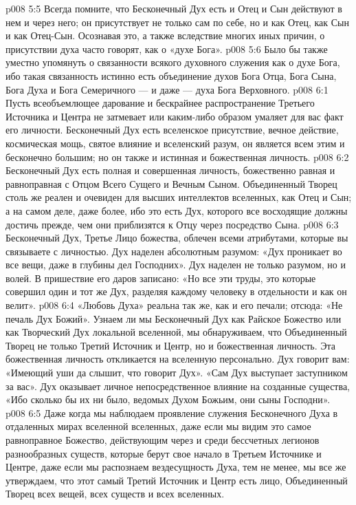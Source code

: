 \vs p008 5:5 Всегда помните, что Бесконечный Дух есть    и Отец и Сын действуют в нем и через него; он присутствует не только сам по себе, но и как Отец, как Сын и как Отец\hyp{}Сын. Осознавая это, а также вследствие многих иных причин, о присутствии духа часто говорят, как о «духе Бога».
\vs p008 5:6 Было бы также уместно упомянуть о связанности всякого духовного служения как о духе Бога, ибо такая связанность истинно есть объединение духов Бога Отца, Бога Сына, Бога Духа и Бога Семеричного --- и даже --- духа Бога Верховного.
\vs p008 6:1 Пусть всеобъемлющее дарование и бескрайнее распространение Третьего Источника и Центра не затмевает или каким\hyp{}либо образом умаляет для вас факт его личности. Бесконечный Дух есть вселенское присутствие, вечное действие, космическая мощь, святое влияние и вселенский разум, он является всем этим и бесконечно большим; но он также и истинная и божественная личность.
\vs p008 6:2 Бесконечный Дух есть полная и совершенная личность, божественно равная и равноправная с Отцом Всего Сущего и Вечным Сыном. Объединенный Творец столь же реален и очевиден для высших интеллектов вселенных, как Отец и Сын; а на самом деле, даже более, ибо это есть Дух, которого все восходящие должны достичь прежде, чем они приблизятся к Отцу через посредство Сына.
\vs p008 6:3 Бесконечный Дух, Третье Лицо божества, облечен всеми атрибутами, которые вы связываете с личностью. Дух наделен абсолютным разумом: «Дух проникает во все вещи, даже в глубины дел Господних». Дух наделен не только разумом, но и волей. В пришествие его даров записано: «Но все эти труды, это которые совершил один и тот же Дух, разделяя каждому человеку в отдельности и как он велит».
\vs p008 6:4 «Любовь Духа» реальна так же, как и его печали; отсюда: «Не печаль Дух Божий». Узнаем ли мы Бесконечный Дух как Райское Божество или как Творческий Дух локальной вселенной, мы обнаруживаем, что Объединенный Творец не только Третий Источник и Центр, но и божественная личность. Эта божественная личность откликается на вселенную персонально. Дух говорит вам: «Имеющий уши да слышит, что говорит Дух». «Сам Дух выступает заступником за вас». Дух оказывает личное непосредственное влияние на созданные существа, «Ибо сколько бы их ни было, ведомых Духом Божьим, они сыны Господни».
\vs p008 6:5 Даже когда мы наблюдаем проявление служения Бесконечного Духа в отдаленных мирах вселенной вселенных, даже если мы видим это самое равноправное Божество, действующим через и среди бессчетных легионов разнообразных существ, которые берут свое начало в Третьем Источнике и Центре, даже если мы распознаем вездесущность Духа, тем не менее, мы все же утверждаем, что этот самый Третий Источник и Центр есть лицо, Объединенный Творец всех вещей, всех существ и всех вселенных.
